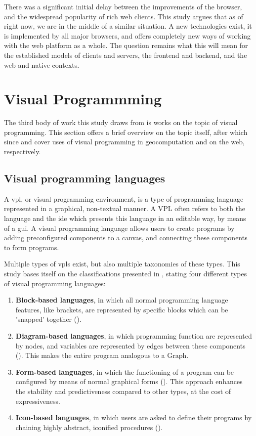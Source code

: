 There was a significant initial delay between the improvements of the browser, and the widespread popularity of rich web clients. 
This study argues that as of right now, we are in the middle of a similar situation. 
A new technologies exist, it is implemented by all major browsers, and offers completely new ways of working with the web platform as a whole. 
The question remains what this will mean for the established models of clients and servers, the frontend and backend, and the web and native contexts. 

\newpage

\section{Visual Programmming}
\label{sec:background-vpl}

The third body of work this study draws from is works on the topic of visual programming. 
This section offers a brief overview on the topic itself, after which since  and  cover uses of visual programming in geocomputation and on the web, respectively. 

\subsection*{Visual programming languages}

A \ac{vpl}, or visual programming environment, is a type of programming language represented in a graphical, non-textual manner.
A VPL often refers to both the language and the \ac{ide} which presents this language in an editable way, by means of a \ac{gui}.
A visual programming language allows users to create programs by adding preconfigured components to a canvas, and connecting these components to form programs. 

Multiple types of \ac{vpl}s exist, but also multiple taxonomies of these types.
This study bases itself on the classifications presented in \cite{kuhail_characterizing_2021}, stating four different types of visual programming languages: 
\begin{enumerate}
  \item \textbf{Block-based languages}, in which all normal programming language features, like brackets, are represented by specific blocks which can be 'snapped' together (\label{fig:sidebyside:1}).
  \item \textbf{Diagram-based languages}, in which programming function are represented by nodes, and variables are represented by edges between these components (\label{fig:sidebyside:2}). This makes the entire program analogous to a Graph.
  \item \textbf{Form-based languages}, in which the functioning of a program can be configured by means of normal graphical forms (\label{fig:sidebyside:3}). 
  This approach enhances the stability and predictiveness compared to other types, at the cost of expressiveness.
  \item \textbf{Icon-based languages}, in which users are asked to define their programs by chaining highly abstract, iconified procedures (\label{fig:sidebyside:4}). 
\end{enumerate}


